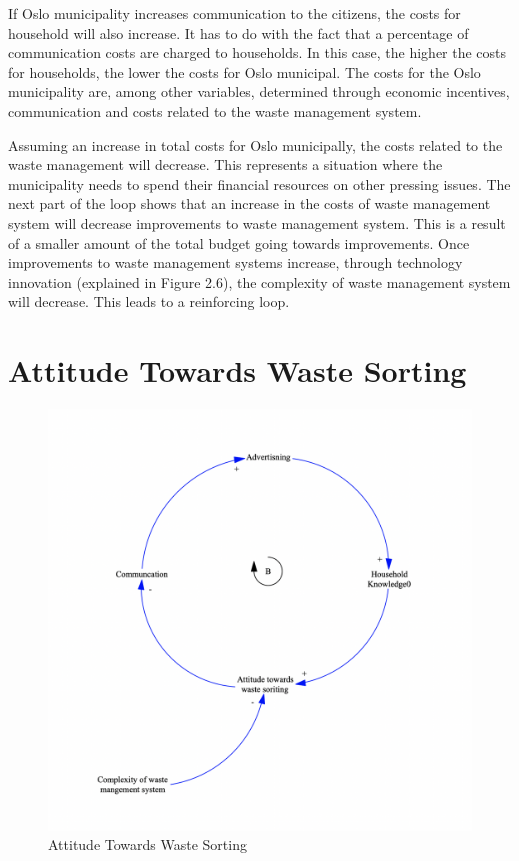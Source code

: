 \indent \newline
If Oslo municipality increases communication to the citizens, the costs for household will also increase. It has to do with the fact that a percentage of communication costs are charged to households. In this case, the higher the costs for households, the lower the costs for Oslo municipal. The costs for the Oslo municipality are, among other variables, determined through economic incentives, communication and costs related to the waste management system.  

\indent \newline
Assuming an increase in total costs for Oslo municipally, the costs related to the waste management will decrease. This represents a situation where the municipality needs to spend their financial resources on other pressing issues. The next part of the loop shows that an increase in the costs of waste management system will decrease improvements to waste management system. This is a result of a smaller amount of the total budget going towards improvements. Once improvements to waste management systems increase, through technology innovation (explained in Figure 2.6), the complexity of waste management system will decrease. This leads to a reinforcing loop. 

\section{Attitude Towards Waste Sorting}

\begin{figure}[H]
\centering
\includegraphics [scale=0.30,angle=360]{figures/attitude.png}
\caption{Attitude Towards Waste Sorting}
\label{fig:attitude}
\end{figure}


